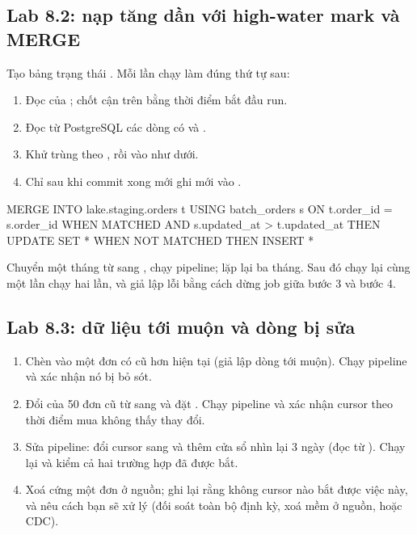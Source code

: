 \subsection{Lab 8.2: nạp tăng dần với high-water mark và MERGE}
Tạo bảng trạng thái . Mỗi lần chạy làm đúng thứ tự sau:
\begin{enumerate}
  \item Đọc  của ; chốt cận trên  bằng thời điểm bắt đầu run.
  \item Đọc từ PostgreSQL các dòng có  và .
  \item Khử trùng theo , rồi  vào  như dưới.
  \item Chỉ sau khi  commit xong mới ghi  mới vào .
\end{enumerate}
\begin{codeblock}
MERGE INTO lake.staging.orders t
USING batch_orders s
ON t.order_id = s.order_id
WHEN MATCHED AND s.updated_at > t.updated_at THEN UPDATE SET *
WHEN NOT MATCHED THEN INSERT *
\end{codeblock}
Chuyển một tháng từ  sang , chạy pipeline; lặp lại ba tháng. Sau đó chạy lại cùng một lần chạy hai lần, và giả lập lỗi bằng cách dừng job giữa bước 3 và bước 4.

\subsection{Lab 8.3: dữ liệu tới muộn và dòng bị sửa}
\begin{enumerate}
  \item Chèn vào  một đơn có  cũ hơn  hiện tại (giả lập dòng tới muộn). Chạy pipeline và xác nhận nó bị bỏ sót.
  \item Đổi  của 50 đơn cũ từ  sang  và đặt . Chạy pipeline và xác nhận cursor theo thời điểm mua không thấy thay đổi.
  \item Sửa pipeline: đổi cursor sang  và thêm cửa sổ nhìn lại 3 ngày (đọc từ ). Chạy lại và kiểm cả hai trường hợp đã được bắt.
  \item Xoá cứng một đơn ở nguồn; ghi lại rằng không cursor nào bắt được việc này, và nêu cách bạn sẽ xử lý (đối soát toàn bộ định kỳ, xoá mềm ở nguồn, hoặc CDC).
\end{enumerate}

